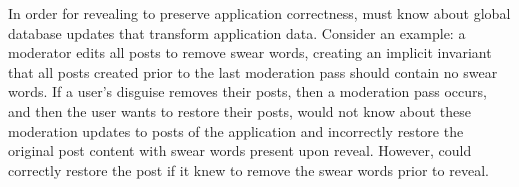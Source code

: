 In order for revealing to preserve application correctness, \sys must know about
global database updates that transform application data.
%
Consider an example: a moderator edits all posts to remove
swear words, creating an implicit invariant that all posts created prior to the
last moderation pass should contain no swear words.
%
If a user's disguise removes their posts, then a moderation pass occurs, and
then the user wants to restore their posts, \sys would not know about these
moderation updates to posts of the application and incorrectly restore the
original post content with swear words present upon reveal.
%
However, \sys could correctly restore the post if it knew to remove the swear
words prior to reveal.
%
%
%

